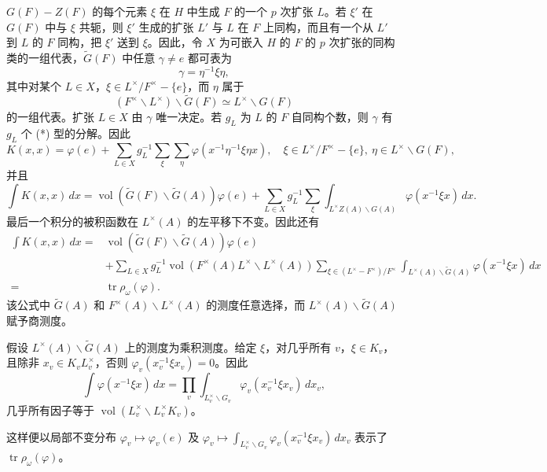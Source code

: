 $G(F)-Z(F)$ 的每个元素 $\xi$ 在 $H$ 中生成 $F$ 的一个 $p$ 次扩张 $L$。若
$\xi'$ 在 $G(F)$ 中与 $\xi$ 共轭，则 $\xi'$ 生成的扩张 $L'$ 与 $L$ 在 $F$ 上同构，而且有一个从 $L'$ 到 $L$ 的 $F$ 同构，把 $\xi'$ 送到 $\xi$。因此，令 $X$ 为可嵌入 $H$ 的 $F$ 的 $p$ 次扩张的同构类的一组代表，$\widetilde G(F)$ 中任意
$\gamma\ne e$ 都可表为
\begin{equation}
 \gamma=\eta^{-1}\xi\eta,\tag{*}
\end{equation}
其中对某个 $L\in X$，$\xi\in L^\times/F^\times-\{e\}$，而 $\eta$ 属于
\[
 (F^\times\backslash L^\times)\backslash\widetilde G(F)
 \simeq L^\times\backslash G(F)
\]
的一组代表。扩张 $L\in X$ 由 $\gamma$ 唯一决定。若 $g_L$ 为 $L$ 的 $F$ 自同构个数，则
$\gamma$ 有 $g_L$ 个 (*) 型的分解。因此
\[
 K(x,x)=\varphi(e)+\sum_{L\in X}g_L^{-1}\sum_\xi\sum_\eta
 \varphi(x^{-1}\eta^{-1}\xi\eta x),
 \quad\xi\in L^\times/F^\times-\{e\},\ \eta\in L^\times\backslash G(F),
\]
并且
\[
 \int K(x,x)\,dx=\operatorname{vol}(\widetilde G(F)\backslash\widetilde G(A))\varphi(e)
 +\sum_{L\in X}g_L^{-1}\sum_\xi
 \int_{L^\times Z(A)\backslash G(A)}\varphi(x^{-1}\xi x)\,dx.
\]
最后一个积分的被积函数在 $L^\times(A)$ 的左平移下不变。因此还有
\begin{equation}
\begin{split}
 \int K(x,x)\,dx={}&\operatorname{vol}(\widetilde G(F)\backslash\widetilde G(A))\varphi(e)\\
 &+\sum_{L\in X}g_L^{-1}\operatorname{vol}(F^\times(A)L^\times\backslash L^\times(A))
 \sum_{\xi\in(L^\times-F^\times)/F^\times}
 \int_{L^\times(A)\backslash\widetilde G(A)}\varphi(x^{-1}\xi x)\,dx\\
 ={}&\operatorname{tr}\rho_\omega(\varphi).
\end{split}\tag{1.11}
\end{equation}
该公式中 $\widetilde G(A)$ 和 $F^\times(A)\backslash L^\times(A)$ 的测度任意选择，而
$L^\times(A)\backslash\widetilde G(A)$ 赋予商测度。

假设 $L^\times(A)\backslash\widetilde G(A)$ 上的测度为乘积测度。给定 $\xi$，对几乎所有
$v$，$\xi\in K_v$，且除非 $x_v\in K_vL_v^\times$，否则
$\varphi_v(x_v^{-1}\xi x_v)=0$。因此
\[
 \int\varphi(x^{-1}\xi x)\,dx
 =\prod_v\int_{L_v^\times\backslash G_v}\varphi_v(x_v^{-1}\xi x_v)\,dx_v,
\]
几乎所有因子等于 $\operatorname{vol}(L_v^\times\backslash L_v^\times K_v)$。

这样便以局部不变分布 $\varphi_v\mapsto\varphi_v(e)$ 及
$\varphi_v\mapsto\int_{L_v^\times\backslash G_v}\varphi_v(x_v^{-1}\xi x_v)\,dx_v$
表示了 $\operatorname{tr}\rho_\omega(\varphi)$。

